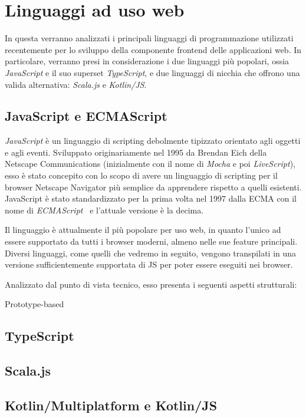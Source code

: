   \section{Linguaggi ad uso web}\label{sec:lang}
    In questa  verranno analizzati i principali linguaggi di programmazione utilizzati recentemente per lo sviluppo della componente frontend delle applicazioni web.
    In particolare, verranno presi in considerazione i due linguaggi più popolari, ossia \emph{JavaScript} e il suo superset \emph{TypeScript}, e due linguaggi di nicchia che offrono una valida alternativa: \emph{Scala.js} e \emph{Kotlin/JS}\@.

    \subsection{JavaScript e ECMAScript}\label{subsec:js}

    \emph{JavaScript} è un linguaggio di scripting debolmente tipizzato orientato agli oggetti e agli eventi.
    Sviluppato originariamente nel 1995 da Brendan Eich della Netscape Communications (inizialmente con il nome di \emph{Mocha} e poi \emph{LiveScript}),
    esso è stato concepito con lo scopo di avere un linguaggio di scripting per il browser Netscape Navigator più semplice da apprendere rispetto a quelli esistenti.
    JavaScript è stato standardizzato per la prima volta nel 1997 dalla ECMA con il nome di \emph{ECMAScript}~\cite{ECMA-262,ISOCS1998} e l'attuale versione è la decima.

    Il linguaggio è attualmente il più popolare per uso web, in quanto l'unico ad essere supportato da tutti i browser moderni, almeno nelle sue feature principali.
    Diversi linguaggi, come quelli che vedremo in seguito, vengono transpilati in una versione sufficientemente supportata di JS per poter essere eseguiti nei browser.

    Analizzato dal punto di vista tecnico, esso presenta i seguenti aspetti strutturali:

    \begin{description}
      \item[Prototype-based] %
    \end{description}

    \subsection{TypeScript}\label{subsec:ts}
    \subsection{Scala.js}
    \subsection{Kotlin/Multiplatform e Kotlin/JS}
